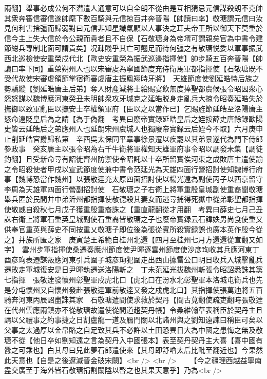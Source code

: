兩翻】舉事必成公何不潜遣人通意可以自全朗不從由是互相猜忌元信謀殺朗不克帥其衆奔審信審信遂帥麾下數百騎與元信掠百井奔晉陽【帥讀曰率】敬瑭謂元信曰汝見何利害捨彊而歸弱對曰元信非知星識氣顧以人事決之耳夫帝王所以御天下莫重於信今主上失大信於令公親而貴者且不自保【石敬瑭身為帝壻可謂親矣官為中書令建節縂兵專制北面可謂貴矣】况疎賤乎其亡可翹足而待何彊之有敬瑭悦委以軍事振武西北巡檢使安重榮戍代北【歐史安重榮為振武巡邊指揮使】帥步騎五百奔晉陽【帥讀曰率下同】重榮朔州人也以宋審䖍為寧國節度充侍衛馬軍都指揮使【石敬瑭既不受代故使宋審䖍領節掌宿衛審䖍唐主振鳳翔時牙將】　天雄節度使劉延皓恃后族之勢驕縱【劉延皓唐主后弟】奪人財產減將士給賜宴飲無度捧聖都虞候張令昭因衆心怨怒謀以魏博應河東癸丑未明帥衆攻牙城克之延皓脱身走亂兵大掠令昭奏延皓失於撫御以致軍亂臣以撫安士卒權領軍府【臣以之以當作已】乞賜旌節延皓至洛陽唐主怒命遠貶皇后為之請【為于偽翻　考異曰廢帝實録延皓皇后之姪按薛史唐餘録歐陽史皆云延皓后之弟應州人也延朗宋州虞城人也獨廢帝實録云后姪今不取】六月庚申止削延皓官爵歸私第　辛酉吳太保同平章事徐景遷以疾罷以其弟景遂代為門下侍郎參政事　癸亥唐主以張令昭為右千牛衛將軍權知天雄軍府事令昭以調發未集【調徒釣翻】且受新命尋有詔徙齊州防禦使令昭託以十卒所留實俟河東之成敗唐主遣使諭之令昭殺使者甲戌以宣武節度使兼中書令范延光為天雄四面行營招討使知魏博行府事【魏博恐當作魏州】以張敬逹充太原四面招討使以楊光遠為副使丙子以西京留守李周為天雄軍四面行營副招討使　石敬瑭之子右衛上將軍重殷皇城副使重裔聞敬瑭舉兵匿於民間井中弟沂州都指揮使敬德殺其妻女而逃尋捕得死獄中從弟彰聖都指揮使敬威自殺秋七月戊子獲重殷重裔誅之【重直龍翻從才用翻　考異曰薛史七月己丑誅右衛上將軍石重英皇城副使石重裔皆敬瑭之子也廢帝實録云石諱妷男尚食使重又供奉官重英與薛史不同按重乂敬瑭子即位後為張從賓所殺實録誤也廣本英作殷今從之】并族所匿之家　庚寅楚王希範自桂州北還【四月至桂州七月方還還從宣翻又如字】　雲州步軍指揮使桑遷奏應州節度使尹暉逐雲州節度使沙彦珣收其兵應河東丁酉彦珣表遷謀叛應河東引兵圍子城彦珣犯圍走出西山據雷公口明日收兵入城擊亂兵遷敗走軍城復安是日尹暉執遷送洛陽斬之　丁未范延光拔魏州斬張令昭詔悉誅其黨七指揮　張敬逹發懷州彰聖軍戍虎北口【虎北口在汾水北彰聖軍本洛城屯衛兵也先是分屯懷州又自懷州發赴張敬逹軍前敬逹又發之戍虎北口】其指揮使張萬迪將五百騎奔河東丙辰詔盡誅其家　石敬瑭遣間使求救於契丹【間古莧翻使疏吏翻時張敬逹在代州雲應兩鎮亦不從敬瑭故遣使從間道趨契丹帳】令桑維翰草表稱臣於契丹主且請以父禮事之約事捷之日割盧龍一道及鴈門關以北諸州與之劉知遠諫曰稱臣可矣以父事之太過厚以金帛賂之自足致其兵不必許以土田恐異日大為中國之患悔之無及敬瑭不從【他日卒如劉知遠之言為契丹入中國張本】表至契丹契丹主大喜【喜中國有釁之可乘也】白其母曰兒此夢石郎遣使來【其母即舒嚕太后比毗至翻近也】今果然此天意也【自是之後遼滅晉金破宋闕】<br />
<br />
　　【今之疆理西越益寧南盡交廣至于海外皆石敬瑭捐割關隘以啓之也其果天意乎】乃為<br />
